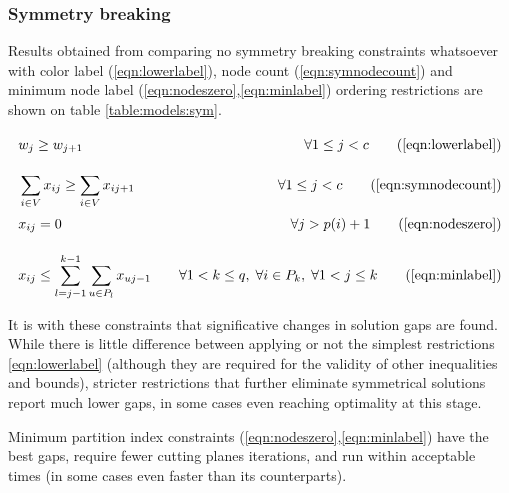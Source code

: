 \subsubsection{Symmetry breaking}

Results obtained from comparing no symmetry breaking constraints whatsoever with color label (\ref{eqn:lowerlabel}), node count (\ref{eqn:symnodecount}) and minimum node label (\ref{eqn:nodeszero},\ref{eqn:minlabel}) ordering restrictions are shown on table \ref{table:models:sym}.

\begin{align*}
& w_j \geq w_{j+1} \sumheight \quad &\forall 1 \leq j < c \tag{\ref{eqn:lowerlabel}} \\
& \sum_{i \in V} x_{ij} \geq \sum_{i \in V} x_{ij+1} \quad &\forall 1 \leq j < c \tag{\ref{eqn:symnodecount}} \\
& x_{ij} = 0 \sumheight \quad &\forall j > p(i) + 1 \tag{\ref{eqn:nodeszero}} \\
& x_{ij} \leq \sum_{l = j-1}^{k-1} \sum_{u \in P_l} x_{uj-1} \quad &\forall 1 < k \leq q, \; \forall i \in P_k, \; \forall 1 < j \leq k \tag{\ref{eqn:minlabel}}
\end{align*}

It is with these constraints that significative changes in solution gaps are found. While there is little difference between applying or not the simplest restrictions \ref{eqn:lowerlabel} (although they are required for the validity of other inequalities and bounds), stricter restrictions that further eliminate symmetrical solutions report much lower gaps, in some cases even reaching optimality at this stage. 

Minimum partition index constraints (\ref{eqn:nodeszero},\ref{eqn:minlabel}) have the best gaps, require fewer cutting planes iterations, and run within acceptable times (in some cases even faster than its counterparts).

